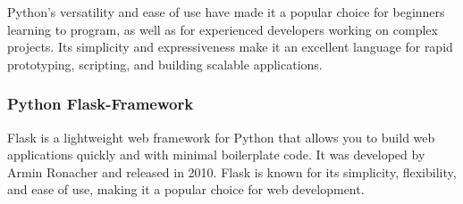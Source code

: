\documentclass[12 pt, oneside]{book}
\begin{document}
Python's versatility and ease of use have made it a popular choice for beginners learning to program, as well as for experienced developers working on complex projects. Its simplicity and expressiveness make it an excellent language for rapid prototyping, scripting, and building scalable applications.

\subsubsection{Python Flask-Framework}
Flask is a lightweight web framework for Python that allows you to build web applications quickly and with minimal boilerplate code. It was developed by Armin Ronacher and released in 2010. Flask is known for its simplicity, flexibility, and ease of use, making it a popular choice for web development.
\end{document}
